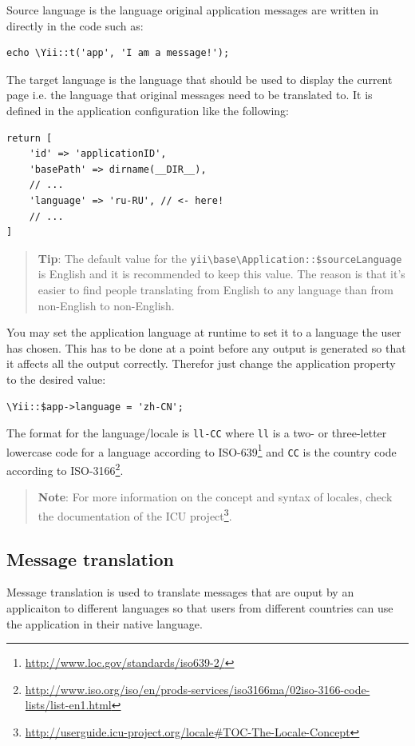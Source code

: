 Source language is the language original application messages are written in directly in the code such as:

\lstset{language=php}\begin{lstlisting}
echo \Yii::t('app', 'I am a message!');
\end{lstlisting}
The target language is the language that should be used to display the current page i.e. the language that original messages need
to be translated to. It is defined in the application configuration like the following:

\lstset{language=php}\begin{lstlisting}
return [
    'id' => 'applicationID',
    'basePath' => dirname(__DIR__),
    // ...
    'language' => 'ru-RU', // <- here!
    // ...
]
\end{lstlisting}
\begin{quote}\textbf{Tip}: The default value for the \texttt{yii{\allowbreak{}\textbackslash}base{\allowbreak{}\textbackslash}Application\allowbreak{}::\allowbreak{}\$sourceLanguage} is English and it is
recommended to keep this value. The reason is that it's easier to find people translating from
English to any language than from non-English to non-English.

\end{quote}
You may set the application language at runtime to set it to a language the user has chosen.
This has to be done at a point before any output is generated so that it affects all the output correctly.
Therefor just change the application property to the desired value:

\lstset{language=php}\begin{lstlisting}
\Yii::$app->language = 'zh-CN';
\end{lstlisting}
The format for the language/locale is \lstinline|ll-CC| where \lstinline|ll| is a two- or three-letter lowercase code for a language according to
ISO-639\footnote{\url{http://www.loc.gov/standards/iso639-2/}} and \lstinline|CC| is the country code according to
ISO-3166\footnote{\url{http://www.iso.org/iso/en/prods-services/iso3166ma/02iso-3166-code-lists/list-en1.html}}.

\begin{quote}\textbf{Note}: For more information on the concept and syntax of locales, check the
documentation of the ICU project\footnote{\url{http://userguide.icu-project.org/locale\#TOC-The-Locale-Concept}}.

\end{quote}
\subsection{Message translation}
Message translation is used to translate messages that are ouput by an applicaiton to different languages
so that users from different countries can use the application in their native language.

